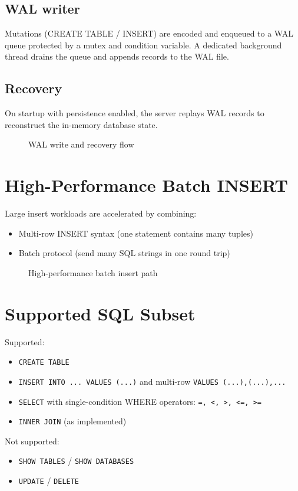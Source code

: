 \documentclass[11pt,a4paper]{article}
\begin{document}
\subsection{WAL writer}
Mutations (CREATE TABLE / INSERT) are encoded and enqueued to a WAL queue protected by a mutex and condition variable. A dedicated background thread drains the queue and appends records to the WAL file.

\subsection{Recovery}
On startup with persistence enabled, the server replays WAL records to reconstruct the in-memory database state.

\begin{figure}[H]
\centering

\caption{WAL write and recovery flow}
\end{figure}

\section{High-Performance Batch INSERT}
Large insert workloads are accelerated by combining:
\begin{itemize}
  \item Multi-row INSERT syntax (one statement contains many tuples)
  \item Batch protocol (send many SQL strings in one round trip)
\end{itemize}

\begin{figure}[H]
\centering

\caption{High-performance batch insert path}
\end{figure}

\section{Supported SQL Subset}
Supported:
\begin{itemize}
  \item \texttt{CREATE TABLE}
  \item \texttt{INSERT INTO ... VALUES (...)} and multi-row \texttt{VALUES (...),(...),...}
  \item \texttt{SELECT} with single-condition WHERE operators: \texttt{=, <, >, <=, >=}
  \item \texttt{INNER JOIN} (as implemented)
\end{itemize}
Not supported:
\begin{itemize}
  \item \texttt{SHOW TABLES} / \texttt{SHOW DATABASES}
  \item \texttt{UPDATE} / \texttt{DELETE}
\end{itemize}
\end{document}
